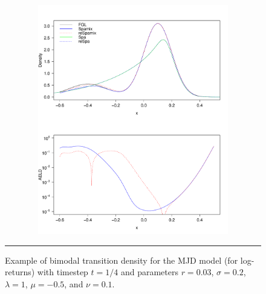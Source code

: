 \begin{figure}[htbp]
	\centering
	\includegraphics[width=13cm,height=10cm]{./Figures/tdmjdbimodal.pdf}
	\rule{35em}{0.5pt}
	\caption[Transition densities: bimodal Merton jump-diffusion]{Example of bimodal transition density for the MJD model (for log-returns) with timestep $t=1/4$ and parameters $r=0.03$, $\sigma=0.2$, $\lambda = 1$, $\mu=-0.5$, and $\nu=0.1$.}\label{fig: tdmjdbimodal}
\end{figure}

